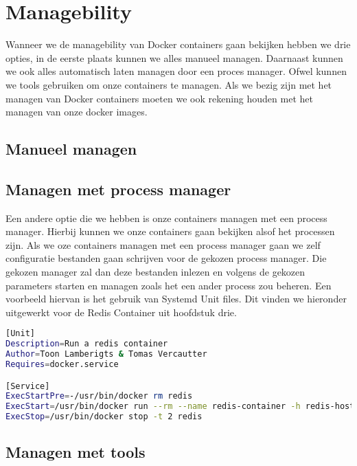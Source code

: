 \chapter{Managebility}

Wanneer we de managebility van Docker containers gaan bekijken hebben we drie opties, in de eerste plaats kunnen we alles manueel managen. Daarnaast kunnen we ook alles automatisch laten managen door een proces manager. Ofwel kunnen we tools gebruiken om onze containers te managen. Als we bezig zijn met het managen van Docker containers moeten we ook rekening houden met het managen van onze docker images. 

\section{Manueel managen}


\section{Managen met process manager}

Een andere optie die we hebben is onze containers managen met een process manager. Hierbij kunnen we onze containers gaan bekijken alsof het processen zijn. Als we oze containers managen met een process manager gaan we zelf configuratie bestanden gaan schrijven voor de gekozen process manager. Die gekozen manager zal dan deze bestanden inlezen en volgens de gekozen parameters starten en managen zoals het een ander process zou beheren. Een voorbeeld hiervan is het gebruik van Systemd Unit files. Dit vinden we hieronder uitgewerkt voor de Redis Container uit hoofdstuk drie.

\begin{lstlisting}[language=bash, style=configstyle]
[Unit]
Description=Run a redis container
Author=Toon Lamberigts & Tomas Vercautter
Requires=docker.service

[Service]
ExecStartPre=-/usr/bin/docker rm redis
ExecStart=/usr/bin/docker run --rm --name redis-container -h redis-host redis
ExecStop=/usr/bin/docker stop -t 2 redis
\end{lstlisting}

\section{Managen met tools}